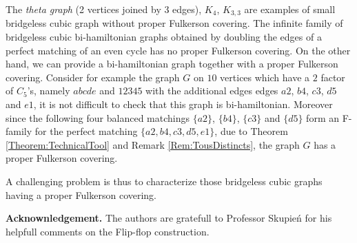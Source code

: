 \documentclass{amsart}
\theoremstyle{definition}
\theoremstyle{remark}
\begin{document}
The {\em theta graph }(2 vertices joined by 3 edges), $K_{4}$,
$K_{3,3}$ are examples of small bridgeless cubic graph without
proper Fulkerson covering. The infinite family of bridgeless cubic
bi-hamiltonian graphs obtained by doubling the edges of a perfect matching of an
even cycle has no proper Fulkerson covering.
On the other hand, we can provide a bi-hamiltonian graph together with a proper
Fulkerson covering. Consider for example the graph $G$ on $10$ vertices which
have a $2$ factor of $C_5$'s, namely $abcde$ and $12345$ with the additional
edges edges $a2$, $b4$, $c3$, $d5$ and $e1$, it is not difficult to check that
this graph is bi-hamiltonian. Moreover since the following four balanced
matchings $\{a2\}$, $\{b4\}$, $\{c3\}$ and $\{d5\}$ form an F-family for the
perfect matching $\{a2,b4,c3,d5,e1\}$, due to Theorem
\ref{Theorem:TechnicalTool} and Remark \ref{Rem:TousDistincts}, the graph $G$
has a proper Fulkerson covering.


A challenging problem is thus
to characterize those bridgeless cubic graphs having a proper Fulkerson
covering.

{\bf Acknownledgement.} The authors are gratefull to Professor Skupie\'n for his
helpfull comments on the Flip-flop construction.


\end{document}
